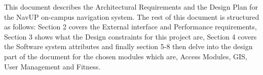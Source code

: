 This document describes the Architectural Requirements and the Design Plan for the NavUP on-campus navigation system. The rest of this document is structured as follows: Section 2 covers the External interface and Performance requirements, Section 3 shows what the Design constraints for this project are, Section 4 covers the Software system attributes and finally section 5-8 then delve into the design part of the document for the chosen modules which are, Access Modules, GIS, User Management and Fitness.